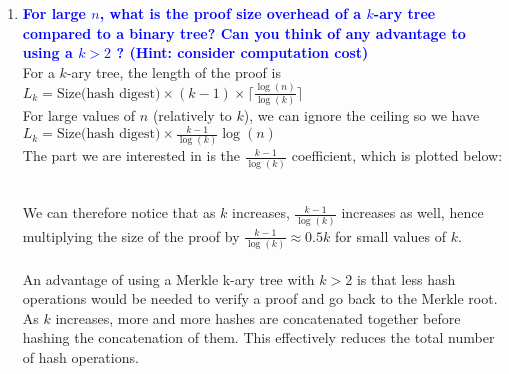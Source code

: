 \documentclass[11pt]{article}
\begin{document}
\begin{enumerate}
\begin{enumerate}
    \item \textbf{\textcolor{blue}{For large $n$, what is the proof size overhead of a $k$-ary tree compared to a binary tree? Can you think of any advantage to using a $k > 2$ ? (Hint: consider computation cost)}}
        \\ For a $k$-ary tree, the length of the proof is $L_k = \text{Size(hash digest)} \times (k - 1) \times \lceil \frac{\log(n)}{\log(k)} \rceil$
        \\ For large values of $n$ (relatively to $k$), we can ignore the ceiling so we have $L_k = \text{Size(hash digest)} \times \frac{k-1}{\log(k)}\log(n)$
        \\ The part we are interested in is the $\frac{k-1}{\log(k)}$ coefficient, which is plotted below:
        \newline
        \newline
        \newline
        \\ We can therefore notice that as $k$ increases, $\frac{k-1}{\log(k)}$ increases as well, hence multiplying the size of the proof by $\frac{k-1}{\log(k)} \approx 0.5k$ for small values of $k$.
        \\\\ An advantage of using a Merkle k-ary tree with $k > 2$ is that less hash operations would be needed to verify a proof and go back to the Merkle root. As $k$ increases, more and more hashes are concatenated together before hashing the concatenation of them. This effectively reduces the total number of hash operations.
    
    \end{enumerate}
    

\end{enumerate}
\end{document}
